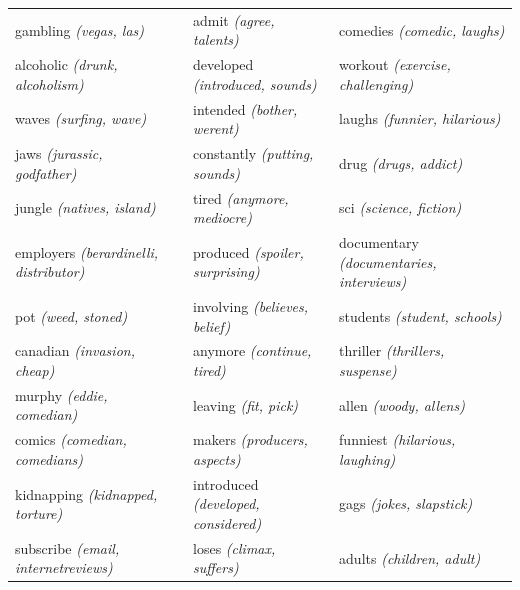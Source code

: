{\begin{landscape}
\begin{table}[]
\begin{tabular}{llll}
			gambling \textit{(vegas, las)}                 &                          & admit \textit{(agree, talents)}                  & comedies \textit{(comedic, laughs)}              \\
			alcoholic \textit{(drunk, alcoholism)}         &                          & developed \textit{(introduced, sounds)}          & workout \textit{(exercise, challenging)}         \\
			waves \textit{(surfing, wave)}                 &                          & intended \textit{(bother, werent)}               & laughs \textit{(funnier, hilarious)}             \\
			jaws \textit{(jurassic, godfather)}            &                          & constantly \textit{(putting, sounds)}            & drug \textit{(drugs, addict)}                    \\
			jungle \textit{(natives, island)}              &                          & tired \textit{(anymore, mediocre)}               & sci \textit{(science, fiction)}                  \\
			employers \textit{(berardinelli, distributor)} &                          & produced \textit{(spoiler, surprising)}          & documentary \textit{(documentaries, interviews)} \\
			pot \textit{(weed, stoned)}                    &                          & involving \textit{(believes, belief)}            & students \textit{(student, schools)}             \\
			canadian \textit{(invasion, cheap)}            &                          & anymore \textit{(continue, tired)}               & thriller \textit{(thrillers, suspense)}          \\
			murphy \textit{(eddie, comedian)}              &                          & leaving \textit{(fit, pick)}                     & allen \textit{(woody, allens)}                   \\
			comics \textit{(comedian, comedians)}          &                          & makers \textit{(producers, aspects)}             & funniest \textit{(hilarious, laughing)}          \\
			kidnapping \textit{(kidnapped, torture)}       &                          & introduced \textit{(developed, considered)}      & gags \textit{(jokes, slapstick)}                 \\
			subscribe \textit{(email, internetreviews)}    &                          & loses \textit{(climax, suffers)}                 & adults \textit{(children, adult)}                \\

\end{tabular}
\end{table}
\end{landscape}}
